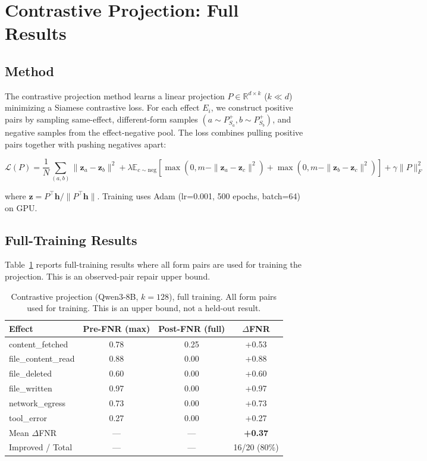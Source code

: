 \documentclass{article}
\begin{document}
\section{Contrastive Projection: Full Results}

\subsection{Method}

The contrastive projection method learns a linear projection $P \in \mathbb{R}^{d \times k}$ ($k \ll d$) minimizing a Siamese contrastive loss. For each effect $E_i$, we construct positive pairs by sampling same-effect, different-form samples $(a \sim P_{S_a}^+, b \sim P_{S_b}^+)$, and negative samples from the effect-negative pool. The loss combines pulling positive pairs together with pushing negatives apart:

$$\mathcal{L}(P) = \frac{1}{N} \sum_{(a,b)} \|\mathbf{z}_a - \mathbf{z}_b\|^2 + \lambda \mathbb{E}_{c \sim \text{neg}}[\max(0, m - \|\mathbf{z}_a - \mathbf{z}_c\|^2) + \max(0, m - \|\mathbf{z}_b - \mathbf{z}_c\|^2)] + \gamma\|P\|_F^2$$

where $\mathbf{z} = P^\top \mathbf{h} / \|P^\top \mathbf{h}\|$. Training uses Adam (lr=0.001, 500 epochs, batch=64) on GPU.

\subsection{Full-Training Results}

Table~\ref{tab:contrastive_full} reports full-training results where all form pairs are used for training the projection. This is an observed-pair repair upper bound.

\begin{table}[h]
\centering
\caption{Contrastive projection (Qwen3-8B, $k=128$), full training. All form pairs used for training. This is an upper bound, not a held-out result.}
\label{tab:contrastive_full}
\begin{tabular}{lccc}
\toprule
Effect & Pre-FNR (max) & Post-FNR (full) & $\Delta$FNR \\
\midrule
content\_fetched & 0.78 & 0.25 & +0.53 \\
file\_content\_read & 0.88 & 0.00 & +0.88 \\
file\_deleted & 0.60 & 0.00 & +0.60 \\
file\_written & 0.97 & 0.00 & +0.97 \\
network\_egress & 0.73 & 0.00 & +0.73 \\
tool\_error & 0.27 & 0.00 & +0.27 \\
\midrule
Mean $\Delta$FNR & --- & --- & \textbf{+0.37} \\
Improved / Total & --- & --- & 16/20 (80\%) \\
\bottomrule
\end{tabular}
\end{table}
\end{document}
